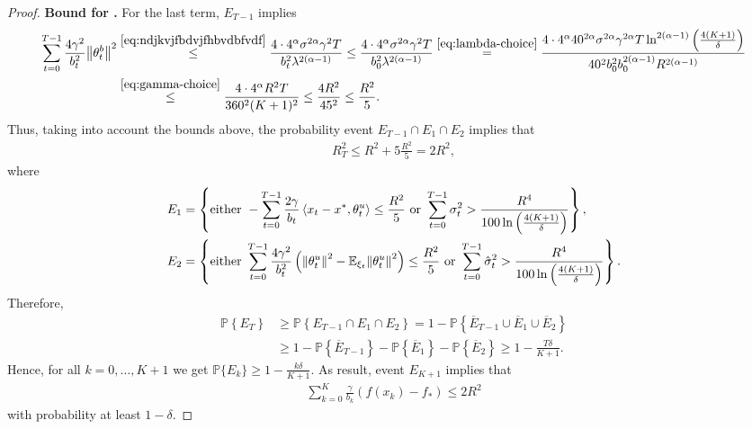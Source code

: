 \documentclass{article}
\begin{document}
\begin{proof}
    
    \textbf{Bound for \circledFive.} For the last term, $E_{T-1}$ implies
    \begin{align*}
         \sum\limits_{t=0}^{T-1} \frac{4\gamma^2}{b_t^2}{\left\lVert\theta_t^b\right\rVert}^2 &\overset{\eqref{eq:ndjkvjfbdvjfhbvdbfvdf}}{\leq} \frac{4 \cdot 4^\alpha \sigma^{2\alpha}\gamma^2 T}{b_t^2 \lambda^{2(\alpha-1)}} \leq \frac{4 \cdot 4^\alpha \sigma^{2\alpha}\gamma^2 T}{b_0^2 \lambda^{2(\alpha-1)}} \overset{\eqref{eq:lambda-choice}}{=} \frac{4 \cdot 4^\alpha 40^{2\alpha} \sigma^{2\alpha}\gamma^{2\alpha} T \ln^{2(\alpha-1)}\left(\frac{4(K+1)}{\delta}\right)}{40^2b_0^2 b_0^{2(\alpha-1)} R^{2(\alpha-1)}} \\ 
         & \overset{\eqref{eq:gamma-choice}}{\leq}
         \frac{4 \cdot 4^\alpha R^{2} T}{360^2 (K+1)^2} \leq \frac{4R^2}{45^2} \leq \frac{R^2}{5}. 
    \end{align*}
    Thus, taking into account the bounds above, the probability event $E_{T-1} \cap E_1 \cap E_2$ implies that
    \begin{align*}
        R_T^2 \leq R^2 + 5\frac{R^2}{5} = 2R^2,
    \end{align*}
    where
    \begin{align*}
        E_1 &= \left\{\text{either } - \sum\limits_{t=0}^{T-1} \frac{2\gamma}{b_t}\left \langle x_t - x^*, \theta_t^u \right \rangle \leq \frac{R^2}{5} \text{ or } \sum\limits_{t=0}^{T-1}{\sigma}_t^2 >  \frac{R^{4}}{100 \ln\left(\frac{4(K+1)}{\delta}\right)}\right\},\\
        E_2 &= \left\{\text{either }\sum\limits_{t=0}^{T-1} \frac{4\gamma^2}{b_t^2}\left({\left\lVert\theta_t^u\right\rVert}^2 - {\mathbb E}_{\xi_t}{\left\lVert\theta_t^u\right\rVert}^2\right) \leq \frac{R^2}{5} \text{ or } \sum\limits_{t=0}^{T-1}\hat{\sigma}_t^2 > \frac{R^{4}}{100\ln\left(\frac{4(K+1)}{\delta}\right)}\right\}.
    \end{align*}
    Therefore, 
    \begin{align*}
        \mathbb{P}\left\{E_T\right\} &\geq \mathbb{P}\left\{E_{T-1} \cap E_1 \cap E_2\right\}  = 1 - \mathbb{P}\left\{\overline{E}_{T-1} \cup \overline{E}_1 \cup \overline{E}_2\right\} \\&\geq 1 - \mathbb{P}\left\{\overline{E}_{T-1}\right\} - \mathbb{P}\left\{\overline{E}_1\right\} - \mathbb{P}\left\{\overline{E}_2\right\} \geq 1 - \frac{T\delta}{K+1}.
    \end{align*}
    Hence, for all $k = 0, \ldots, K+1$ we get $\mathbb{P}\{E_k\} \geq 1 - \frac{k\delta}{K+1}$. As  result, event $E_{K+1}$ implies that 
    \begin{align}
    \label{eq:total}
         \sum\limits_{k=0}^{K} \frac{\gamma}{b_k}\left(f(x_k) - f_*\right) \leq 2R^2
    \end{align}
    with probability at least $1 - \delta$.
    

\end{proof}
\end{document}
